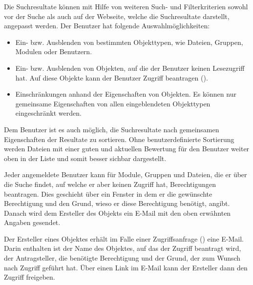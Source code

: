 Die Suchresultate können mit Hilfe von weiteren Such- und Filterkriterien sowohl vor der Suche als auch auf der Webseite, welche die Suchresultate darstellt, angepasst werden. Der Benutzer hat folgende Auswahlmöglichkeiten:
\begin{itemize}
\item Ein- bzw. Ausblenden von bestimmten Objekttypen, wie Dateien, Gruppen, Modulen oder Benutzern.
\item Ein- bzw. Ausblenden von Objekten, auf die der Benutzer keinen Lesezugriff hat. Auf diese Objekte kann der Benutzer Zugriff beantragen (). 
\item Einschränkungen anhand der Eigenschaften von Objekten. Es können nur gemeinsame Eigenschaften von allen eingeblendeten Objekttypen eingeschränkt werden.
\end{itemize}
Dem Benutzer ist es auch möglich, die Suchresultate nach gemeinsamen Eigenschaften der Resultate zu sortieren. Ohne benutzerdefinierte Sortierung werden Dateien mit einer guten und aktuellen Bewertung für den Benutzer weiter oben in der Liste und somit besser sichbar dargestellt.

Jeder angemeldete Benutzer kann für Module, Gruppen und Dateien, die er über die Suche findet, auf welche er aber keinen Zugriff hat, Berechtigungen beantragen. Dies geschieht über ein Fenster in dem er die gewünschte Berechtigung und den Grund, wieso er diese Berechtigung benötigt, angibt. Danach wird dem Ersteller des Objekts ein E-Mail mit den oben erwähnten Angaben gesendet.

Der Ersteller eines Objektes erhält im Falle einer Zugriffsanfrage () eine E-Mail. Darin enthalten ist der Name des Objektes, auf das der Zugriff beantragt wird, der Antragsteller, die benötigte Berechtigung und der Grund, der zum Wunsch nach Zugriff geführt hat. Über einen Link im E-Mail kann der Ersteller dann den Zugriff freigeben.
